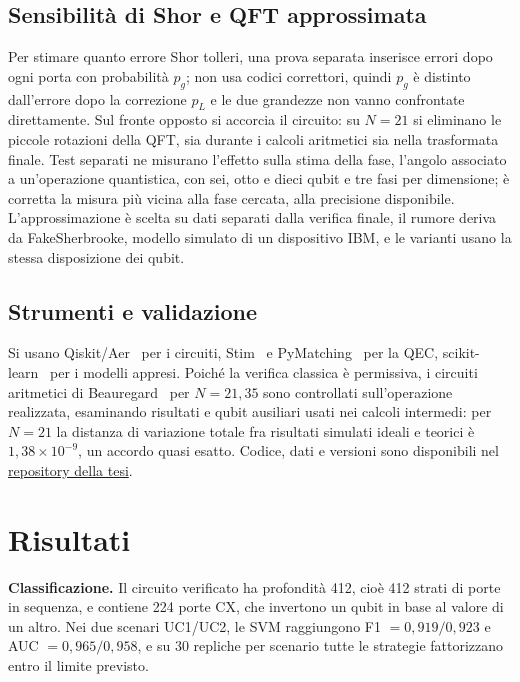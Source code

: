 \subsection*{Sensibilità di Shor e QFT approssimata}

Per stimare quanto errore Shor tolleri, una prova separata inserisce errori dopo
ogni porta con probabilità $p_g$; non usa codici correttori, quindi $p_g$ è
distinto dall'errore dopo la correzione $p_L$ e le due grandezze non vanno
confrontate direttamente.
Sul fronte opposto si accorcia il circuito: su $N=21$ si eliminano le piccole
rotazioni della QFT, sia durante i calcoli aritmetici sia nella trasformata
finale.
Test separati ne misurano l'effetto sulla stima della fase, l'angolo associato a
un'operazione quantistica, con sei, otto e dieci qubit e tre fasi per dimensione;
è corretta la misura più vicina alla fase cercata, alla precisione disponibile.
L'approssimazione è scelta su dati separati dalla verifica finale, il rumore
deriva da FakeSherbrooke, modello simulato di un dispositivo IBM, e le varianti
usano la stessa disposizione dei qubit.

\subsection*{Strumenti e validazione}

Si usano Qiskit/Aer~\cite{qiskit2023} per i circuiti, Stim~\cite{stim2021} e
PyMatching~\cite{pymatching2021} per la QEC, scikit-learn~\cite{scikit_learn} per
i modelli appresi.
Poiché la verifica classica è permissiva, i circuiti aritmetici di
Beauregard~\cite{beauregard2002} per $N=21,35$ sono controllati sull'operazione
realizzata, esaminando risultati e qubit ausiliari usati nei calcoli intermedi:
per $N=21$ la distanza di variazione totale fra risultati simulati ideali e
teorici è $1{,}38\times10^{-9}$, un accordo quasi esatto.
Codice, dati e versioni sono disponibili nel
\href{https://github.com/claudio-dragotta/shor-nisq-qec-thesis}{repository della tesi}.

\section*{Risultati}

\textbf{Classificazione.} Il circuito verificato ha profondità 412, cioè 412
strati di porte in sequenza, e contiene 224 porte CX, che invertono un qubit in
base al valore di un altro.
Nei due scenari UC1/UC2, le SVM raggiungono F1 $=0{,}919/0{,}923$ e
AUC $=0{,}965/0{,}958$, e su 30 repliche per scenario tutte le strategie
fattorizzano entro il limite previsto.

